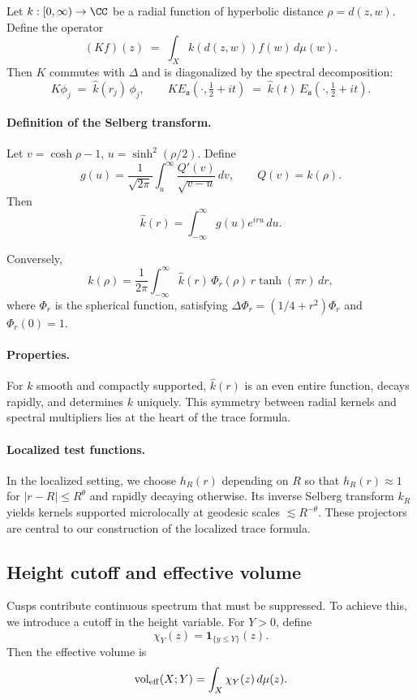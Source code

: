 Let $k : [0,\infty) \to \CC$ be a radial function of hyperbolic distance $\rho = d(z,w)$. Define the operator
\[
(Kf)(z) \;=\; \int_X k(d(z,w)) f(w)\, d\mu(w).
\]
Then $K$ commutes with $\Delta$ and is diagonalized by the spectral decomposition: 
\[
K\phi_j \;=\; \widehat{k}(r_j)\,\phi_j, \qquad K E_\mathfrak{a}(\cdot,\tfrac12+it) \;=\; \widehat{k}(t)\,E_\mathfrak{a}(\cdot,\tfrac12+it).
\]

\paragraph{Definition of the Selberg transform.}
Let $v = \cosh\rho - 1$, $u = \sinh^2(\rho/2)$. Define
\[
g(u) = \frac{1}{\sqrt{2\pi}} \int_u^\infty \frac{Q'(v)}{\sqrt{v-u}}\,dv,\qquad Q(v) = k(\rho).
\]
Then
\[
\widehat{k}(r) = \int_{-\infty}^\infty g(u) e^{iru}\,du.
\]

Conversely,
\[
k(\rho) = \frac{1}{2\pi}\int_{-\infty}^\infty \widehat{k}(r)\, \Phi_r(\rho)\, r\tanh(\pi r)\,dr,
\]
where $\Phi_r$ is the spherical function, satisfying $\Delta \Phi_r = (1/4+r^2)\Phi_r$ and $\Phi_r(0)=1$.

\paragraph{Properties.}
For $k$ smooth and compactly supported, $\widehat{k}(r)$ is an even entire function, decays rapidly, and determines $k$ uniquely. This symmetry between radial kernels and spectral multipliers lies at the heart of the trace formula.

\paragraph{Localized test functions.}
In the localized setting, we choose $h_R(r)$ depending on $R$ so that $h_R(r)\approx 1$ for $|r-R|\le R^\theta$ and rapidly decaying otherwise. Its inverse Selberg transform $k_R$ yields kernels supported microlocally at geodesic scales $\lesssim R^{-\theta}$. These projectors are central to our construction of the localized trace formula.

\subsection{Height cutoff and effective volume}\label{subsec:cutoff}

Cusps contribute continuous spectrum that must be suppressed. To achieve this, we introduce a cutoff in the height variable. For $Y>0$, define
\[
\chi_Y(z) = \mathbf{1}_{\{ y\le Y\}}(z).
\]
Then the effective volume is
\[
\operatorname{vol}_{\mathrm{eff}}(X;Y) = \int_X \chi_Y(z)\, d\mu(z).
\]

